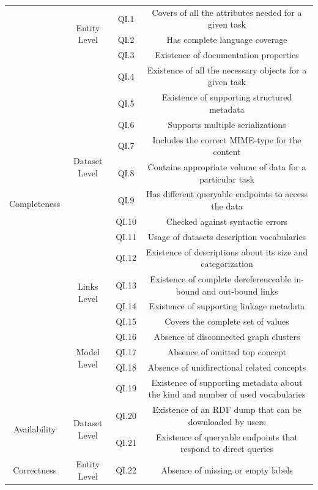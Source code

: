 \documentclass[onecolumn, crcready]{iosart2c}
\begin{document}
\begin{landscape}
\begin{center}
{\begin{longtable}[h]{|c|c|c|c|}
\multirow{19}{*}{Completeness} & \multirow{3}{*}{Entity Level} & QI.1 & Covers of all the attributes needed for a given task \cite{Mendes2012}\tabularnewline
\cline{3-4} 
 &  & QI.2 & Has complete language coverage \cite{Mader2012}\tabularnewline
\cline{3-4} 
 &  & QI.3 & Existence of documentation properties  \cite{w3c_skos_rec}\cite{Mader2012}\tabularnewline
\cline{2-4} 
 & \multirow{9}{*}{Dataset Level} & QI.4 & Existence of all the necessary objects for a given task \cite{Mendes2012}\tabularnewline
\cline{3-4} 
 &  & QI.5 & Existence of supporting structured metadata  \cite{Hogan2010}\tabularnewline
\cline{3-4} 
 &  & QI.6 & Supports multiple serializations \cite{Framework2012}\tabularnewline
\cline{3-4} 
 &  & QI.7 & Includes the correct MIME-type for the content  \cite{Hogan2010}\tabularnewline
\cline{3-4} 
 &  & QI.8 & Contains appropriate volume of data for a particular task \cite{Framework2012}\tabularnewline
\cline{3-4} 
 &  & QI.9 & Has different queryable endpoints to access the data \cite{Framework2012}\tabularnewline
\cline{3-4} 
 &  & QI.10 & Checked against syntactic errors \cite{Hogan2010}\tabularnewline
\cline{3-4} 
 &  & QI.11 & Usage of datasets description vocabularies \tabularnewline
\cline{3-4} 
 &  & QI.12 & Existence of descriptions about its size and categorization \tabularnewline
\cline{2-4} 
 & \multirow{2}{*}{Links Level} & QI.13 & Existence of complete dereferenceable in-bound and out-bound links \cite{Hogan2010}\cite{Mader2012}\cite{Gueret2012}\tabularnewline
\cline{3-4} 
 &  & QI.14 & Existence of supporting linkage metadata  \cite{Hogan2010}\tabularnewline
\cline{2-4} 
 & \multirow{5}{*}{Model Level} & QI.15 & Covers the complete set of values \cite{Mader2012}\tabularnewline
\cline{3-4} 
 &  & QI.16 & Absence of disconnected graph clusters \cite{Mader2012}\tabularnewline
\cline{3-4} 
 &  & QI.17 & Absence of omitted top concept \cite{Hogan2010}\tabularnewline
\cline{3-4} 
 &  & QI.18 & Absence of unidirectional related concepts \cite{Hogan2010}\tabularnewline
\cline{3-4} 
 &  & QI.19 & Existence of supporting metadata about the kind and number of used vocabularies \cite{Framework2012}\tabularnewline
\hline 
\hline 
\multirow{2}{*}{Availability} & \multirow{2}{*}{Dataset Level} & QI.20 & Existence of an RDF dump that can be downloaded by users \cite{flemming2010}\cite{Hogan2010}\tabularnewline
\cline{3-4} 
 &  & QI.21 & Existence of queryable endpoints that respond to direct queries\tabularnewline
\hline 
\hline 
\multirow{8}{*}{Correctness} & \multirow{4}{*}{Entity Level} & QI.22 & Absence of missing or empty labels \cite{Acosta2013}\cite{Mader2012}\tabularnewline

\end{longtable}}
\end{center}
\end{landscape}
\end{document}
